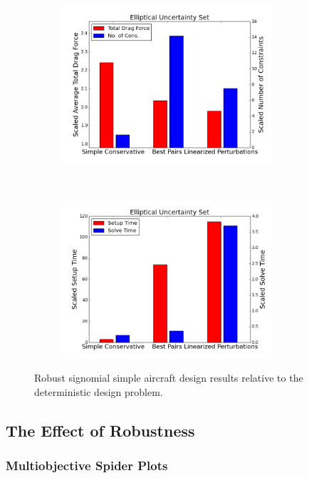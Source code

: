 \begin{figure}[ht]
\begin{subfigure}{0.499\textwidth}
        \includegraphics[height=2.3in]{signomial_simple_flight/ell.png}
    \end{subfigure}%
    ~ 
    \begin{subfigure}{0.49\textwidth}
        \centering
        \includegraphics[height=2.3in]{signomial_simple_flight/ell_times.png}
    \end{subfigure}
    \caption{Robust signomial simple aircraft design results relative to the deterministic design problem.}
    \label{compare_signomial}
\end{figure}

\subsection{The Effect of Robustness}

\subsubsection{Multiobjective Spider Plots}

